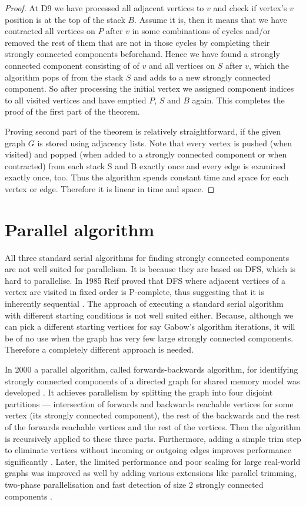 \documentclass{report}
\theoremstyle{plain}
\theoremstyle{definition}
\theoremstyle{remark}
\numberwithin{definition}{chapter}
\numberwithin{example}{chapter}
\numberwithin{figure}{chapter}
\numberwithin{theorem}{chapter}
\numberwithin{lemma}{chapter}
\begin{document}
\begin{proof}
At D9 we have processed all adjacent vertices to $v$ and check if vertex's $v$ position is at the top of the stack $B$. Assume it is, then it means that we have contracted all vertices on $P$ after $v$ in some combinations of cycles and/or removed the rest of them that are not in those cycles by completing their strongly connected components beforehand. Hence we have found a strongly connected component consisting of of $v$ and all vertices on $S$ after $v$, which the algorithm pops of from the stack $S$ and adds to a new strongly connected component. So after processing the initial vertex we assigned component indices to all visited vertices and have emptied $P$, $S$ and $B$ again. This completes the proof  of the first part of the theorem.

Proving second part of the theorem is relatively straightforward, if the given graph $G$ is stored using adjacency lists. Note that every vertex is pushed (when visited) and popped (when added to a strongly connected component or when contracted) from each stack S and B exactly once and every edge is examined exactly once, too. Thus the algorithm spends constant time and space for each vertex or edge. Therefore it is linear in time and space.
\end{proof}

\section{Parallel algorithm}

All three standard serial algorithms for finding strongly connected components are not well suited for parallelism. It is because they are based on DFS, which is hard to parallelise. In 1985 Reif proved that DFS where adjacent vertices of a vertex are visited in fixed order is P-complete, thus suggesting that it is inherently sequential \cite{reif1985depth}. The approach of executing a standard serial algorithm with different starting conditions is not well suited either. Because, although we can pick a different starting vertices for say Gabow's algorithm iterations, it will be of no use when the graph has very few large strongly connected components. Therefore a completely different approach is needed.

In 2000 a parallel algorithm, called forwards-backwards algorithm, for identifying strongly connected components of a directed graph for shared memory model was developed \cite{fleischer2000identifying}. It achieves parallelism by splitting the graph into four disjoint partitions --- intersection of forwards and backwards reachable vertices for some vertex (its strongly connected component), the rest of the backwards and the rest of the forwards reachable vertices and the rest of the vertices. Then the algorithm is recursively applied to these three parts. Furthermore, adding a simple trim step to eliminate vertices without incoming or outgoing edges improves performance significantly \cite{mclendon2005finding}. Later, the limited performance and poor scaling for large real-world graphs was improved as well by adding various extensions like parallel trimming, two-phase parallelisation and fast detection of size 2 strongly connected components \cite{hongtechnical}.
\end{document}
